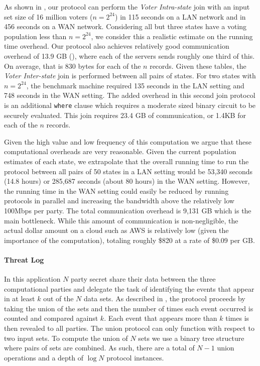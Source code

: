 As shown in , our  protocol can perform the \emph{Voter Intra-state} join with an input set size of 16 million voters ($n=2^{24}$) in 115 seconds on a LAN network and in 456 seconds on a WAN network. Considering all but three states have a voting population less than $n=2^{24}$, we consider this a realistic estimate on the running time overhead. Our protocol also achieves relatively good communication overhead of 13.9 GB (), where each of the servers sends roughly one third of this. On average, that is 830 bytes for each of the $n$ records. Given these tables, the \emph{Voter Inter-state} join is performed between all pairs of states. For two states with $n=2^{24}$, the benchmark machine required 135 seconds in the LAN setting and 748 seconds in the WAN setting. The added overhead in this second join protocol is an additional \texttt{where} clause which requires a moderate sized binary circuit to be securely evaluated. This join requires 23.4 GB of communication, or 1.4KB for each of the $n$ records.

Given the high value and low frequency of this computation we argue that these computational overheads are very reasonable. Given the current population estimates of each state, we extrapolate that the overall running time to run the protocol between all pairs of 50 states in a LAN setting would be 53,340 seconds (14.8 hours) or  285,687 seconds (about 80 hours) in the WAN setting. However, the running time in the WAN setting could easily be reduced by running protocols in parallel and increasing the bandwidth above the relatively low 100Mbps per party. The total communication overhead is 9,131 GB which is the main bottleneck.  While this amount of communication is non-negligible, the actual dollar amount on a cloud such as AWS\cite{aws} is relatively low (given the importance of the computation), totaling roughly \$820 at a rate of \$0.09 per GB\cite{aws_pricing}. 


\paragraph{Threat Log} In this application $N$ party secret share their data between the three computational parties and delegate the task of identifying the events that appear in at least $k$ out of the $N$ data sets. As described in , the protocol proceeds by taking the union of the sets and then the number of times each event occurred is counted and compared against $k$. Each event that appears more than $k$ times is then revealed to all parties. The union protocol can only function with respect to two input sets. To compute the union of $N$ sets we use a binary tree structure where pairs of sets are combined. As such, there are a total of $N-1$ union operations and a depth of $\log N$ protocol instances.

